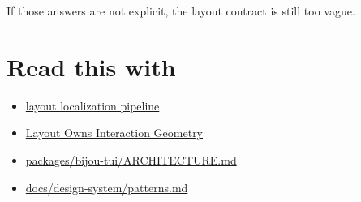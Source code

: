 If those answers are not explicit, the layout contract is still too vague.

\section{Read this with}\label{record-048-read-this-with}

\begin{itemize}
\tightlist
\item
  \href{https://github.com/flyingrobots/bijou/blob/cbd70612140e7a450d764b3c7be1c6af878b99bc/docs/strategy/layout-localization-pipeline.md}{layout localization pipeline}
\item
  \href{https://github.com/flyingrobots/bijou/blob/cbd70612140e7a450d764b3c7be1c6af878b99bc/docs/invariants/layout-owns-interaction-geometry.md}{Layout Owns Interaction Geometry}
\item
  \href{https://github.com/flyingrobots/bijou/blob/cbd70612140e7a450d764b3c7be1c6af878b99bc/packages/bijou-tui/ARCHITECTURE.md}{packages/bijou-tui/ARCHITECTURE.md}
\item
  \href{https://github.com/flyingrobots/bijou/blob/cbd70612140e7a450d764b3c7be1c6af878b99bc/docs/design-system/patterns.md}{docs/design-system/patterns.md}
\end{itemize}

